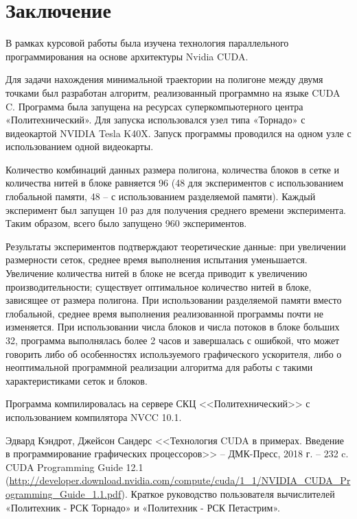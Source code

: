 \documentclass[a4paper, 12pt]{article}
\begin{document}
    \section*{Заключение}

    В рамках курсовой работы была изучена технология параллельного программирования
    на основе архитектуры Nvidia CUDA. 
    
    Для задачи нахождения минимальной траектории на полигоне между двумя точками был разработан  алгоритм, реализованный программно на языке CUDA C. Программа была запущена на
    ресурсах суперкомпьютерного центра «Политехнический». Для запуска использовался
    узел типа «Торнадо» с видеокартой NVIDIA Tesla K40X. Запуск программы проводился
    на одном узле с использованием одной видеокарты.

    Количество комбинаций данных размера полигона, количества блоков в сетке и количества нитей в блоке равняется 96 (48 для экспериментов с использованием глобальной памяти, 48 --  с использованием разделяемой памяти). Каждый эксперимент был запущен 10 раз для получения среднего времени эксперимента. Таким образом, всего было запущено 960 экспериментов. 

    Результаты экспериментов подтверждают теоретические данные: при увеличении размерности сеток, среднее время выполнения испытания уменьшается. Увеличение количества нитей в блоке не всегда приводит к увеличению производительности; существует оптимальное количество нитей в блоке, зависящее от размера полигона. При использовании разделяемой памяти вместо глобальной, среднее время выполнения реализованной программы почти не изменяется. При использовании числа блоков и числа потоков в блоке больших 32, программа выполнялась более 2 часов и завершалась с ошибкой, что может говорить либо об особенностях используемого графического ускорителя, либо о неоптимальной программной реализации алгоритма для работы с такими характеристиками сеток и блоков.

    Программа компилировалась на сервере СКЦ <<Политехнический>> с использованием компилятора NVCC 10.1.
    

    \newpage
    \begin{thebibliography}{}
         Эдвард Кэндрот, Джейсон Сандерс <<Технология CUDA в примерах. Введение в программирование графических процессоров>> -- ДМК-Пресс, 2018 г. -- 232 c.
         CUDA Programming Guide 12.1 (\url{http://developer.download.nvidia.com/compute/cuda/1_1/NVIDIA_CUDA_Programming_Guide_1.1.pdf}).
         Краткое руководство пользователя вычислителей «Политехник - РСК Торнадо» и «Политехник - РСК Петастрим».
	\end{thebibliography}

\end{document}
